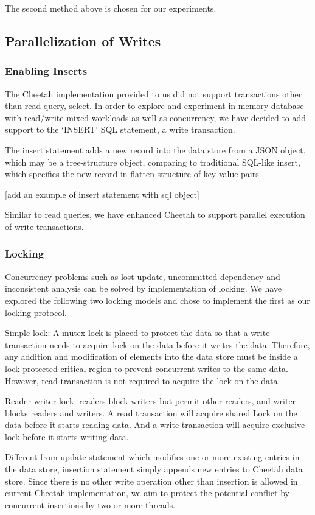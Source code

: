 \documentclass[11pt,journal,compsoc]{IEEEtran}
\begin{document}
The second method above is chosen for our experiments.

\subsection{Parallelization of Writes}
\subsubsection{Enabling Inserts}
The Cheetah implementation provided to us did not support transactions other than read query, select. In order to explore and experiment in-memory database with read/write mixed workloads as well as concurrency, we have decided to add support to the ‘INSERT’ SQL statement, a write transaction.
 
The insert statement adds a new record into the data store from a JSON object, which may be a tree-structure object, comparing to traditional SQL-like insert, which specifies the new record in flatten structure of key-value pairs.

[add an example of insert statement with sql object]
 
Similar to read queries, we have enhanced Cheetah to support parallel execution of write transactions.

\subsubsection{Locking}
Concurrency problems such as lost update, uncommitted dependency and inconsistent analysis can be solved by implementation of locking. We have explored the following two locking models and chose to implement the first as our locking protocol.
 
Simple lock: A mutex lock is placed to protect the data so that a write transaction needs to acquire lock on the data before it writes the data. Therefore, any addition and modification of elements into the data store must be inside a lock-protected critical region to prevent concurrent writes to the same data. However, read transaction is not required to acquire the lock on the data.
 
Reader-writer lock: readers block writers but permit other readers, and writer blocks readers and writers. A read transaction will acquire shared Lock on the data before it starts reading data. And a write transaction will acquire exclusive lock before it starts writing data.
 
Different from update statement which modifies one or more existing entries in the data store, insertion statement simply appends new entries to Cheetah data store. Since there is no other write operation other than insertion is allowed in current Cheetah implementation, we aim to protect the potential conflict by concurrent insertions by two or more threads.
\end{document}
